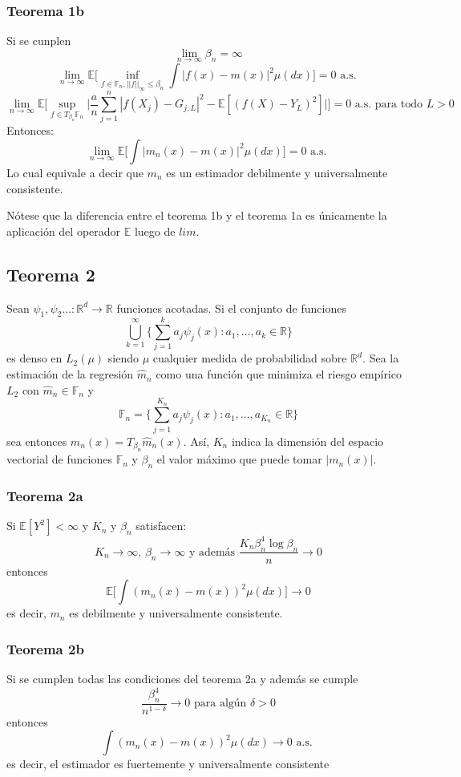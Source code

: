 \documentclass[12pt, a4paper]{article}
\begin{document}
\subsubsection{Teorema 1b}
Si se cunplen
$$
\mathop{lim}_{n\rightarrow\infty} \beta_n = \infty
$$
$$
\mathop{lim}_{n\rightarrow\infty} 
\mathds{E} \Bigg[
\mathop{inf}_{f\in\mathds{F}_n, ||f||_{\infty}  \leq \beta_n} 
\int
|f(x)-m(x)|^2 \mu(dx)
\Bigg]
=0
\text{ a.s. }
$$
$$
\mathop{lim}_{n\rightarrow\infty} 
\mathds{E} \Bigg[
\mathop{sup}_{f\in T_{\beta_n}\mathds{F}_n} 
\Bigg|
\frac{a}{n} \sum_{j=1}^n |f(X_j)-G_{j,L}|^2
-
\mathds{E}[(f(X)-Y_L)^2]
\Bigg| 
\Bigg]
= 0
\text{ a.s. para todo $L>0$}
$$
Entonces:
$$
\mathop{lim}_{n\rightarrow\infty} \mathds{E}
\Bigg[
\int |m_n(x)-m(x)|^2 \mu(dx)
\Bigg] = 0
\text{ a.s. }$$
Lo cual equivale a decir que $m_n$ es un estimador debilmente y universalmente consistente.

Nótese que la diferencia entre el teorema 1b y el teorema 1a es únicamente la aplicación del operador 
$\mathds{E}$ luego de $lim$.

\subsection{Teorema 2}
Sean $\psi_1, \psi_2... :\mathds{R}^d\rightarrow\mathds{R}$ funciones acotadas. Si el conjunto de funciones
$$
\bigcup_{k=1}^{\infty}
\Bigg\{
\sum_{j=1}^k a_j\psi_j(x):a_1,...,a_k \in \mathds{R}  
\Bigg\}
$$
es denso en $L_2(\mu)$ siendo $\mu$ cualquier medida de probabilidad sobre $\mathds{R}^d$. Sea la estimación de la regresión $\hat{m}_n$ como una función que minimiza el riesgo empírico $L_2$ con $\hat{m}_n \in \mathds{F}_n$ y 
$$
\mathds{F}_n = \Bigg\{ \sum_{j=1}^{K_n} a_j\psi_j(x):a_1, ..., a_{K_n} \in \mathds{R}\Bigg\}
$$
sea entonces $m_n(x)=T_{\beta_n} \hat{m}_n(x)$.
Así, $K_n$ indica la dimensión del espacio vectorial de funciones $\mathds{F}_n$ y $\beta_n$ el valor máximo que puede tomar $|m_n(x)|$.
\subsubsection{Teorema 2a}
Si $\mathds{E}[Y^2]<\infty$ y $K_n$ y $\beta_n$ satisfacen:
$$
K_n\rightarrow\infty
\text{, }
\beta_n\rightarrow\infty
\text{ y además }
\frac{ K_n \beta_n^4 \mathop{log} \beta_n }{n}\rightarrow 0
$$
entonces
$$
\mathds{E}
\Bigg[ 
\int 
(m_n(x)-m(x))^2
\mu(dx)
\Bigg]
\rightarrow 0
$$
es decir, $m_n$ es debilmente y universalmente consistente.
\subsubsection{Teorema 2b}
Si se cumplen todas las condiciones del teorema 2a y además se cumple
$$
\frac{\beta_n^4}{n^{1-\delta}}\rightarrow 0 \text{ para algún $\delta>0$}
$$
entonces
$$
\int (m_n(x)-m(x))^2 \mu(dx) \rightarrow 0 \text{ a.s. }
$$
es decir, el estimador es fuertemente y universalmente consistente
\end{document}
